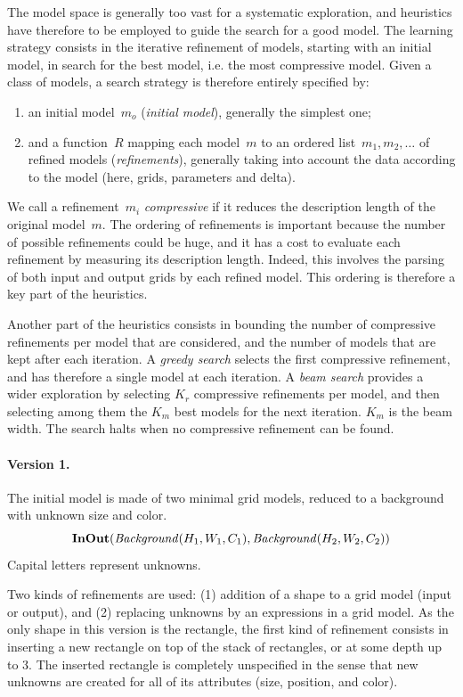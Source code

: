 \documentclass[a4paper]{llncs}
\begin{document}
The model space is generally too vast for a systematic exploration,
and heuristics have therefore to be employed to guide the search for a
good model.
%
The learning strategy consists in the iterative refinement of models,
starting with an initial model, in search for the best model, i.e. the
most compressive model. Given a class of models, a search strategy is
therefore entirely specified by:
\begin{enumerate}
\item an initial model~$m_o$ ({\em initial model}), generally the
  simplest one;
\item and a function~$R$ mapping each model~$m$ to an ordered
  list~$m_1, m_2, \ldots$ of refined models ({\em refinements}),
  generally taking into account the data according to the model (here,
  grids, parameters and delta).
\end{enumerate}
We call a refinement~$m_i$ {\em compressive} if it reduces the
description length of the original model~$m$. The ordering of
refinements is important because the number of possible refinements
could be huge, and it has a cost to evaluate each refinement by
measuring its description length. Indeed, this involves the parsing of
both input and output grids by each refined model.  This ordering is
therefore a key part of the heuristics.

Another part of the heuristics consists in bounding the number of
compressive refinements per model that are considered, and the number
of models that are kept after each iteration. A {\em greedy search}
selects the first compressive refinement, and has therefore a single
model at each iteration. A {\em beam search} provides a wider
exploration by selecting $K_r$ compressive refinements per model, and
then selecting among them the $K_m$ best models for the next
iteration. $K_m$ is the beam width. The search halts when no
compressive refinement can be found.

\paragraph{Version 1.} The initial model is made of two minimal grid
models, reduced to a background with unknown size and color.
\[ {\bf InOut}({\it Background}(H_1,W_1,C_1), {\it
    Background}(H_2,W_2,C_2)) \] Capital letters represent unknowns.

Two kinds of refinements are used: (1) addition
of a shape to a grid model (input or output), and (2) replacing
unknowns by an expressions in a grid model. As the only shape in this
version is the rectangle, the first kind of refinement consists in
inserting a new rectangle on top of the stack of rectangles, or at
some depth up to 3. The inserted rectangle is completely unspecified
in the sense that new unknowns are created for all of its attributes
(size, position, and color).
\end{document}
